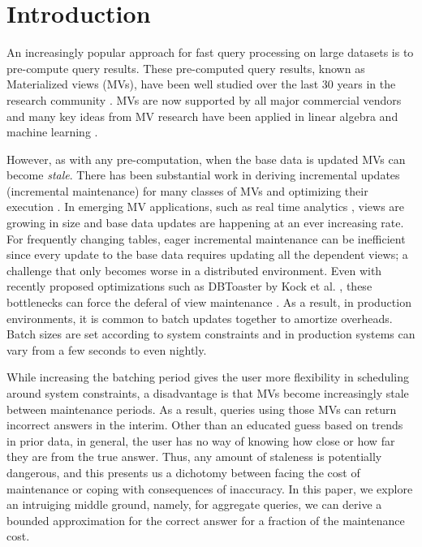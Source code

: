 \vspace{-0.5em}
\section{Introduction}
An increasingly popular approach for fast query processing on large datasets is to pre-compute query results.
These pre-computed query results, known as Materialized views (MVs), have been well studied over the last 30 years in the
research community \cite{LarsonY85, gupta1995maintenance, chirkova2011materialized}.
MVs are now supported by all major commercial vendors and many key ideas from MV research have been applied in linear algebra and machine learning \cite{nikolic2014linview, zhang2014mat}.

However, as with any pre-computation, when the base data is updated MVs can become \emph{stale}. 
There has been substantial work in deriving incremental updates (incremental maintenance) for many classes of MVs and optimizing their execution \cite{chirkova2011materialized, DBLP:journals/vldb/KochAKNNLS14}.
In emerging MV applications, such as real time analytics \cite{rainbird}, views are growing in size and base data updates are happening at an ever increasing rate.
For frequently changing tables, eager incremental maintenance can be inefficient since every update to the base data requires updating all the dependent views; a challenge that only becomes worse in a distributed environment.
Even with recently proposed optimizations such as DBToaster by Kock et al. \cite{DBLP:journals/vldb/KochAKNNLS14}, these bottlenecks can force the deferal of view
maintenance \cite{chirkova2011materialized, zhou2007lazy, DBLP:conf/sigmod/ColbyGLMT96}.
As a result, in production environments, it is common to batch updates together to amortize overheads.
Batch sizes are set according to system constraints and in production systems can vary from a few seconds to even nightly.  

While increasing the batching period gives the user more flexibility in scheduling around system constraints, a disadvantage is that MVs become increasingly stale between maintenance periods.
As a result, queries using those MVs can return incorrect answers in the interim.
Other than an educated guess based on trends in prior data, in general, the user has no way of knowing how close or how far they are from the true answer.
Thus, any amount of staleness is potentially dangerous, and this presents us a dichotomy between facing the cost of maintenance or coping with consequences of inaccuracy.
In this paper, we explore an intruiging middle ground, namely, for aggregate queries, we can derive a bounded approximation for the correct answer for a fraction of the maintenance cost. 

